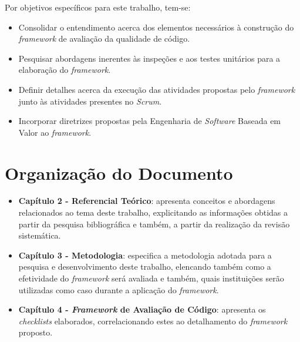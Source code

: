 Por objetivos específicos para este trabalho, tem-se:

\begin{itemize}
	\item Consolidar o entendimento acerca dos elementos necessários à construção do \textit{framework} de avaliação da qualidade de código.
	\item Pesquisar abordagens inerentes às inspeções e aos testes unitários para a elaboração do \textit{framework}.
	\item Definir detalhes acerca da execução das atividades propostas pelo \textit{framework} junto às atividades presentes no \textit{Scrum}.
	\item Incorporar diretrizes propostas pela Engenharia de \textit{Software} Baseada em Valor ao \textit{framework}.
\end{itemize}

\section{Organização do Documento}

\begin{itemize}
	\item \textbf{Capítulo 2 - Referencial Teórico}: apresenta conceitos e abordagens relacionados ao tema deste trabalho, explicitando as informações obtidas a partir da pesquisa bibliográfica e também, a partir da realização da revisão sistemática.

	\item \textbf{Capítulo 3 - Metodologia}: especifica a metodologia adotada para a pesquisa e desenvolvimento deste trabalho, elencando também como a efetividade do \textit{framework} será avaliada e também, quais instituições serão utilizadas como caso durante a aplicação do \textit{framework}.

	\item \textbf{Capítulo 4 - \textit{Framework} de Avaliação de Código}: apresenta os \textit{checklists} elaborados, correlacionando estes ao detalhamento do \textit{framework} proposto.
\end{itemize}